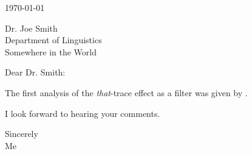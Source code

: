 \documentclass[12pt]{article} %
\begin{document}
\thispagestyle{empty}

\today

Dr. Joe Smith\\
Department of Linguistics\\
Somewhere in the World

Dear Dr. Smith:

The first analysis of the \textit{that}-trace effect as a filter was given by \cite{collobert2008unified}.

I look forward to hearing your comments.

Sincerely\\
Me
\end{document}

